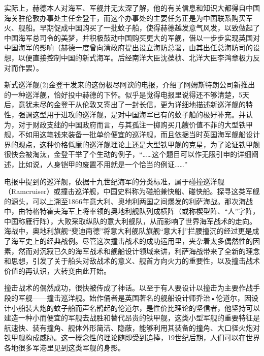 \documentclass[12pt,UTF8]{ctexbook}
\begin{document}
实际上，赫德本人对海军、军舰并无太深了解，他的有关信息和知识大都得自中国海关驻伦敦办事处主任金登干，而这个办事处的主要任务正是为中国联系购买军火、舰船。早期促成中国购买了一批蚊子船，使得赫德越发意气风发，以致做起了中国海军总司令的美梦，并积极鼓动中国购买更大的军舰，借以一步步实现英国对中国海军的影响（赫德一度曾向清政府提出设立海防总署，由其出任总海防司的设想，以便直接控制中国的新式海军。后经南洋大臣沈葆桢、北洋大臣李鸿章极力反对而作罢）。

新式巡洋舰(2)金登干发来的这份极尽阿谀的电报，介绍了阿姆斯特朗公司新推出的一种巡洋舰，恰好投中赫德的下怀。似乎是觉得电报里说得还不够清楚，5天后，意犹未尽的金登干从伦敦又寄出了一封长信，更为详细地描述新巡洋舰的特性，强调这型用于进攻的巡洋舰，是对中国海军已有的蚊子船的极好补充。并认为，对于财政支绌的中国政府而言，与其孤注一掷购买几艘价值不菲的大型铁甲舰，不如用这笔钱来装备一批单价便宜的巡洋舰，而且依据当时英国海军舰船设计界的观点，这种价格低廉的巡洋舰理论上还是大型铁甲舰的克星，为了论证铁甲舰很快会被淘汰，金登干举了个生动的例子，“……这个题目可以作无限引申的详细阐述，比如说，人身铠甲的废置不用就是一个恰当的例证……”

电报中提到的巡洋舰，依据十九世纪海军的分类标准，属于碰撞巡洋舰（Ramcruiser）或撞击巡洋舰，中国史料称为碰船兼快船、碰快船。探寻这类军舰的源头，可以上溯至1866年意大利、奥地利两国之间爆发的利萨海战。那次海战中，由特格特霍夫海军上将率领的奥地利舰队列成横阵（或称楔型阵、“人”字阵，中国称雁行阵），大败采取纵队的意大利舰队，从而影响了世界海军战术的走向。海战中，奥地利旗舰“斐迪南德”将意大利舰队旗舰“意大利”拦腰撞沉的经过更是成了海军史上的经典战例。尽管这次撞击战术的成功运用里，夹杂着太多偶然性的因素，然而对沉寂已久的海军战术和舰船设计领域来讲，利萨海战带来了全新的理念和思想，引发了关于船头对敌战术的意义、舰首方向火力的重要性，以及撞击战术价值的再认识，大转变由此开始。

撞击战术的偶然成功，很快被传成了神话。以至于有人要设计以撞击为主要作战手段的军舰——撞击巡洋舰。始作俑者是英国著名的舰船设计师乔治•伦道尔，因设计小船装大炮的蚊子船而声名鹊起的伦道尔，是性价比理论的坚信者，他坚持可以建造一种小而便宜的军舰去战胜和替代昂贵的铁甲舰，这类小型军舰的重要特征是航速快、装有撞角、舰体外形简洁、隐蔽，能够利用其装备的撞角、大口径火炮对铁甲舰构成威胁。这一概念性的理论随即受到追捧，19世纪后期，人们可以在世界各地很多军港里见到这类军舰的身影。
\end{document}
